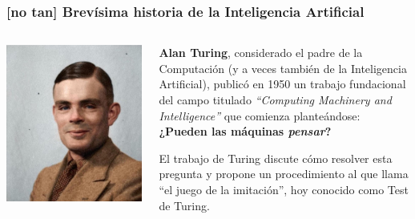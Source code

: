 \documentclass{beamer}
\begin{document}
\begin{frame}
    \frametitle{[no tan] \bfseries Brevísima historia de la Inteligencia Artificial}

    \begin{columns}
        \begin{column}{0.4\textwidth}
            \centering
            \includegraphics[width=\textwidth]{alan-turing-colorized.jpg}
            \pause
            \\
        \end{column}
        
        \begin{column}{0.6\textwidth}
        \textbf{Alan Turing}, considerado el padre de la Computación (y a veces también de la Inteligencia Artificial), publicó en 1950 un trabajo fundacional del campo titulado \textit{``Computing Machinery and Intelligence''}
        que comienza planteándose: \textbf{¿Pueden las máquinas \textit{pensar}?} \par\vspace{1mm} El trabajo de Turing
        discute cómo resolver esta pregunta y propone un procedimiento al que llama ``el juego de la
        imitación'', hoy conocido como Test de Turing.
        \end{column}
        
    \end{columns}
\end{frame}
\end{document}
